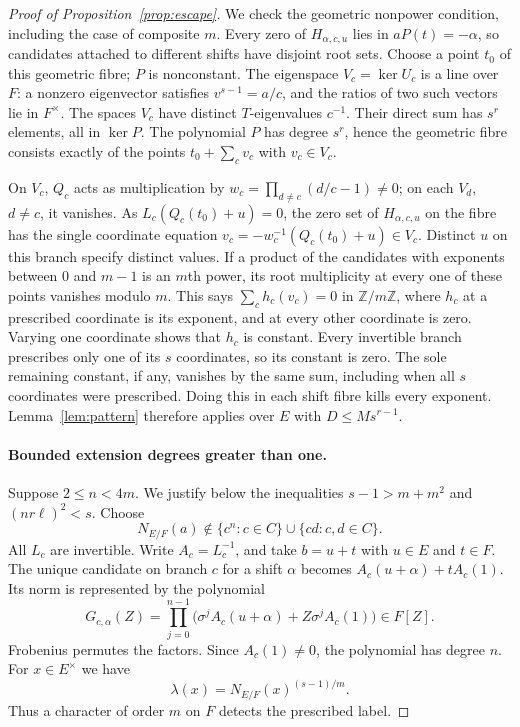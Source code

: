 \documentclass[preprint,12pt,numbers]{elsarticle}
\begin{document}
\begin{proof}[Proof of Proposition~\ref{prop:escape}]
We check the geometric nonpower condition, including the case of
composite $m$. Every zero of $H_{\alpha,c,u}$ lies in $aP(t)=-\alpha$,
so candidates attached to different shifts have disjoint root sets.
Choose a point $t_0$ of this geometric fibre; $P$ is nonconstant.
The eigenspace $V_c=\ker U_c$ is a line over $F$: a nonzero eigenvector
satisfies $v^{s-1}=a/c$, and the ratios of two such vectors lie in
$F^\times$. The spaces $V_c$ have distinct $T$-eigenvalues $c^{-1}$.
Their direct sum has $s^r$ elements, all in $\ker P$. The polynomial
$P$ has degree $s^r$, hence the geometric fibre consists exactly of
the points $t_0+\sum_c v_c$ with $v_c\in V_c$.

On $V_c$, $Q_c$ acts as multiplication by
$w_c=\prod_{d\ne c}(d/c-1)\ne0$; on each $V_d$, $d\ne c$, it vanishes.
As $L_c(Q_c(t_0)+u)=0$, the zero set of $H_{\alpha,c,u}$ on the fibre
has the single coordinate equation
$v_c=-w_c^{-1}(Q_c(t_0)+u)\in V_c$. Distinct $u$ on this branch specify
distinct values. If a product of the candidates with exponents between
$0$ and $m-1$ is an $m$th power, its root multiplicity at every one of
these points vanishes modulo $m$. This says
$\sum_c h_c(v_c)=0$ in $\mathbb Z/m\mathbb Z$, where $h_c$ at a
prescribed coordinate is its exponent, and at every other coordinate is
zero. Varying one coordinate shows that $h_c$ is constant. Every
invertible branch prescribes only one of its $s$ coordinates, so its
constant is zero. The sole remaining constant, if any, vanishes by the
same sum, including when all $s$ coordinates were prescribed. Doing
this in each shift fibre kills every exponent. Lemma~\ref{lem:pattern}
therefore applies over $E$ with $D\le Ms^{r-1}$.

\paragraph{Bounded extension degrees greater than one.}
Suppose $2\le n<4m$. We justify below the inequalities
$s-1>m+m^2$ and $(nr\ell)^2<s$. Choose
\[
 N_{E/F}(a)\notin\{c^n:c\in C\}\cup\{cd:c,d\in C\}.
\]
All $L_c$ are invertible. Write $A_c=L_c^{-1}$, and take $b=u+t$ with
$u\in E$ and $t\in F$. The unique candidate on branch $c$ for a shift
$\alpha$ becomes $A_c(u+\alpha)+tA_c(1)$. Its norm is represented by
the polynomial
\[
 G_{c,\alpha}(Z)=
 \prod_{j=0}^{n-1}\bigl(\sigma^j A_c(u+\alpha)+Z\sigma^j A_c(1)\bigr)
 \in F[Z].
\]
Frobenius permutes the factors. Since $A_c(1)\ne0$, the polynomial
has degree $n$. For $x\in E^\times$ we have
\[
  \lambda(x)=N_{E/F}(x)^{(s-1)/m}.
\]
Thus a character of order $m$ on $F$ detects the prescribed label.


\end{proof}
\end{document}

